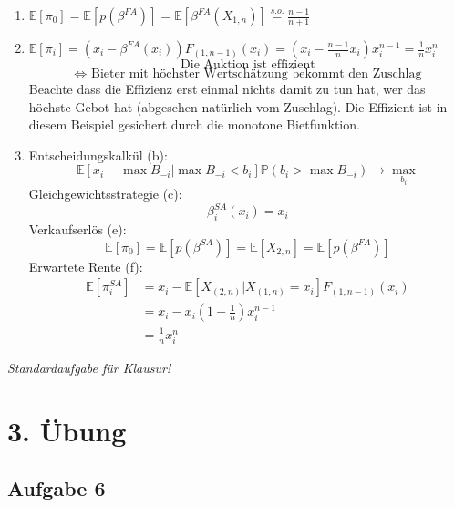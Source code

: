 \documentclass[12pt]{extreport} %
\theoremstyle{named}
\theoremstyle{itshape}
\theoremstyle{normal}
\begin{document}
\begin{enumerate}
		\begin{proof}
			 $$ \mathds{E}\left[ X_{(2,n)} \right] = \frac{n-2+1}{n-1} = \frac{n-1}{n+1} $$ 
			 $$ \mathds{E}\left[ \beta^{FA}(X_{1,n}) \right] = \mathds{E}\left[ \left( 1 - \frac{1}{n} \right) X_{1,n} \right] = \left( 1 - \frac{1}{n} \right) \frac{n}{n+1} = \frac{n-1}{n+1} $$
		\end{proof}
	\item $\mathds{E}\left[ \pi_0 \right] = \mathds{E}\left[ p \left( \beta^{FA} \right) \right] = \mathds{E}\left[ \beta^{FA} \left( X_{1,n} \right) \right] \overset{s.o.}{=} \frac{n-1}{n+1}$ 
	\item $\mathds{E}\left[ \pi_i \right] = \left( x_i - \beta^{FA}(x_i) \right) F_{(1,n-1)}(x_{i}) = \left( x_i - \frac{n-1}{n} x_i \right) x_i^{n-1} = \frac{1}{n} x_i^n$ ~\\
		$$ \text{Die Auktion ist effizient} $$ 
		$$ \iff \text{ Bieter mit höchster Wertschätzung bekommt den Zuschlag} $$
		Beachte dass die Effizienz erst einmal nichts damit zu tun hat, wer das höchste Gebot hat (abgesehen natürlich vom Zuschlag). Die Effizient ist in diesem Beispiel gesichert durch die monotone Bietfunktion.
	\item Entscheidungskalkül (b):
		$$ \mathds{E} \left[ x_i - \max B_{-i} \big| \max B_{-i} < b_{i} \right] \mathds{P} \left( b_i > \max B_{-i} \right) \longrightarrow \max_{b_i} $$
		Gleichgewichtsstrategie (c):
			$$ \beta_i^{SA}(x_i) = x_i $$
		Verkaufserlös (e):
			$$ \mathds{E}[\pi_{0}] = \mathds{E}\left[ p\left( \beta^{SA} \right) \right] = \mathds{E}[ X_{2,n} ] = \mathds{E} \left[ p\left( \beta^{FA} \right) \right] $$
		Erwartete Rente (f):
			\begin{align*}
				\mathds{E}[\pi_i^{SA}] & = x_i - \mathds{E} \left[ X_{(2,n)} \big|  X_{(1,n)} = x_i \right] F_{(1,n-1)}(x_i) \\
				& = x_i - x_i \left( 1 - \frac{1}{n} \right) x_i^{n-1} \\
				& = \frac{1}{n} x_i^n
			\end{align*}
\end{enumerate}

\textit{Standardaufgabe für Klausur!}

\newpage

\section*{3. Übung}

\subsection*{Aufgabe 6}
\end{document}
